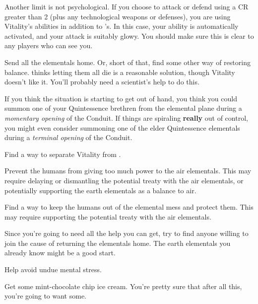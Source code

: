 \documentclass[char]{elementals}
\begin{document}
Another limit is not psychological.  If you choose to attack or defend using a CR greater than 2 (plus any technological weapons or defenses), you are using Vitality's abilities in addition to \cAvatar{}'s.  In this case, your \aGlowInDark{} ability is automatically activated, and your attack is suitably glowy.  You should make sure this is clear to any players who can see you.

\begin{itemz}[Goals]
	\item  Send all the elementals home.  Or, short of that, find some other way of restoring balance.  \cAvatar{} thinks letting them all die is a reasonable solution, though Vitality doesn't like it.  You'll probably need a scientist's help to do this.
	\item If you think the situation is starting to get out of hand, you think you could summon one of your Quintessence brethren from the elemental plane during a \emph{momentary opening} of the Conduit. If things are spiraling \textbf{really} out of control, you might even consider summoning one of the elder Quintessence elementals during a \emph{terminal opening} of the Conduit.
	\item  Find a way to separate Vitality from \cAvatar{}. %
	\item  Prevent the humans from giving too much power to the air elementals.  This may require delaying or dismantling the potential treaty with the air elementals, or potentially supporting the earth elementals as a balance to air.
	\item  Find a way to keep the humans out of the elemental mess and protect them.  This may require supporting the potential treaty with the air elementals.
	\item  Since you're going to need all the help you can get, try to find anyone willing to join the cause of returning the elementals home.  The earth elementals you already know might be a good start.
	\item  Help \cDiplomat{} avoid undue mental stress.
	\item  Get some mint-chocolate chip ice cream.  You're pretty sure that after all this, you're going to want some.
\end{itemz}
\end{document}
